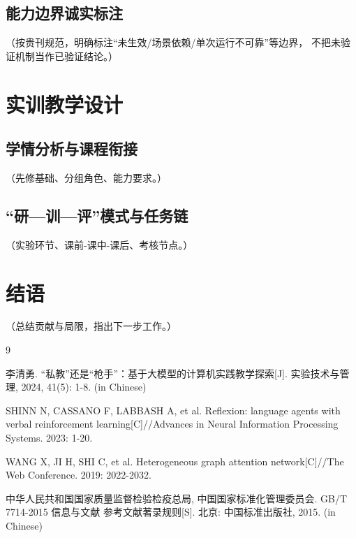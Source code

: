 \documentclass[12pt,a4paper]{ctexart}
\begin{document}
\subsection{能力边界诚实标注}
（按贵刊规范，明确标注“未生效/场景依赖/单次运行不可靠”等边界，
 不把未验证机制当作已验证结论。）

\section{实训教学设计}
\subsection{学情分析与课程衔接}
（先修基础、分组角色、能力要求。）

\subsection{“研—训—评”模式与任务链}
（实验环节、课前-课中-课后、考核节点。）

\section{结语}
（总结贡献与局限，指出下一步工作。）

\begin{thebibliography}{9}

李清勇. “私教”还是“枪手”：基于大模型的计算机实践教学探索[J]. 实验技术与管理, 2024, 41(5): 1-8. (in Chinese)

SHINN N, CASSANO F, LABBASH A, et al. Reflexion: language agents with verbal reinforcement learning[C]//Advances in Neural Information Processing Systems. 2023: 1-20.

WANG X, JI H, SHI C, et al. Heterogeneous graph attention network[C]//The Web Conference. 2019: 2022-2032.

中华人民共和国国家质量监督检验检疫总局, 中国国家标准化管理委员会. GB/T 7714-2015 信息与文献 参考文献著录规则[S]. 北京: 中国标准出版社, 2015. (in Chinese)

\end{thebibliography}
\end{document}
